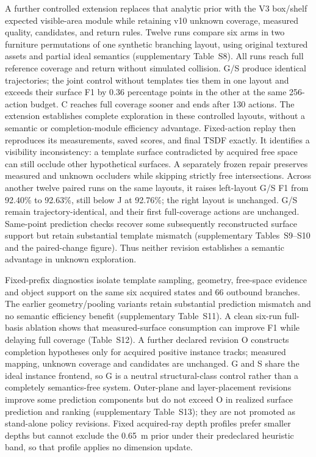 A further controlled extension replaces that analytic prior with the V3 box/shelf expected visible-area module while retaining v10 unknown coverage, measured quality, candidates, and return rules. Twelve runs compare six arms in two furniture permutations of one synthetic branching layout, using original textured assets and partial ideal semantics (supplementary Table~S8). All runs reach full reference coverage and return without simulated collision. G/S produce identical trajectories; the joint control without templates ties them in one layout and exceeds their surface F1 by 0.36 percentage points in the other at the same 256-action budget. C reaches full coverage sooner and ends after 130 actions. The extension establishes complete exploration in these controlled layouts, without a semantic or completion-module efficiency advantage. Fixed-action replay then reproduces its measurements, saved scores, and final TSDF exactly. It identifies a visibility inconsistency: a template surface contradicted by acquired free space can still occlude other hypothetical surfaces. A separately frozen repair preserves measured and unknown occluders while skipping strictly free intersections. Across another twelve paired runs on the same layouts, it raises left-layout G/S F1 from 92.40\% to 92.63\%, still below J at 92.76\%; the right layout is unchanged. G/S remain trajectory-identical, and their first full-coverage actions are unchanged. Same-point prediction checks recover some subsequently reconstructed surface support but retain substantial template mismatch (supplementary Tables~S9--S10 and the paired-change figure). Thus neither revision establishes a semantic advantage in unknown exploration.

Fixed-prefix diagnostics isolate template sampling, geometry, free-space evidence and object support on the same six acquired states and 66 outbound branches. The earlier geometry/pooling variants retain substantial prediction mismatch and no semantic efficiency benefit (supplementary Table~S11). A clean six-run full-basis ablation shows that measured-surface consumption can improve F1 while delaying full coverage (Table~S12). A further declared revision O constructs completion hypotheses only for acquired positive instance tracks; measured mapping, unknown coverage and candidates are unchanged. G and S share the ideal instance frontend, so G is a neutral structural-class control rather than a completely semantics-free system. Outer-plane and layer-placement revisions improve some prediction components but do not exceed O in realized surface prediction and ranking (supplementary Table~S13); they are not promoted as stand-alone policy revisions. Fixed acquired-ray depth profiles prefer smaller depths but cannot exclude the 0.65~m prior under their predeclared heuristic band, so that profile applies no dimension update.

